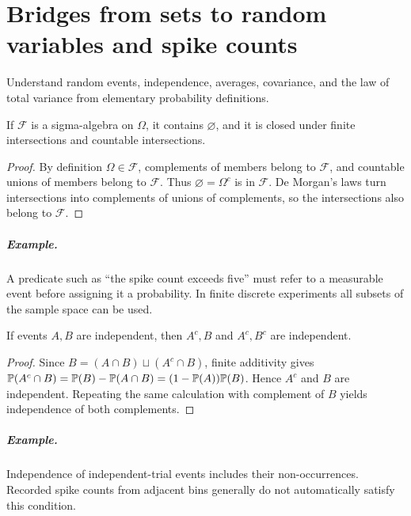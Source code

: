 \chapter{Bridges from sets to random variables and spike counts}\label{ch:bridges-probability}
\begin{readergoal}Understand random events, independence, averages, covariance, and the law of total variance from elementary probability definitions.\end{readergoal}

\begin{proposition}If $\mathcal F$ is a sigma-algebra on $\Omega$, it contains $\varnothing$, and it is closed under finite intersections and countable intersections.\end{proposition}
\begin{proof}By definition $\Omega\in\mathcal F$, complements of members belong to $\mathcal F$, and countable unions of members belong to $\mathcal F$. Thus $\varnothing=\Omega^c$ is in $\mathcal F$. De Morgan's laws turn intersections into complements of unions of complements, so the intersections also belong to $\mathcal F$.\end{proof}
\paragraph{Example.} A predicate such as ``the spike count exceeds five'' must refer to a measurable event before assigning it a probability. In finite discrete experiments all subsets of the sample space can be used.

\begin{proposition}If events $A,B$ are independent, then $A^c,B$ and $A^c,B^c$ are independent.\end{proposition}
\begin{proof}Since $B=(A\cap B)\sqcup(A^c\cap B)$, finite additivity gives $\mathbb P(A^c\cap B)=\mathbb P(B)-\mathbb P(A\cap B)=(1-\mathbb P(A))\mathbb P(B)$. Hence $A^c$ and $B$ are independent. Repeating the same calculation with complement of $B$ yields independence of both complements.\end{proof}
\paragraph{Example.} Independence of independent-trial events includes their non-occurrences. Recorded spike counts from adjacent bins generally do not automatically satisfy this condition.

